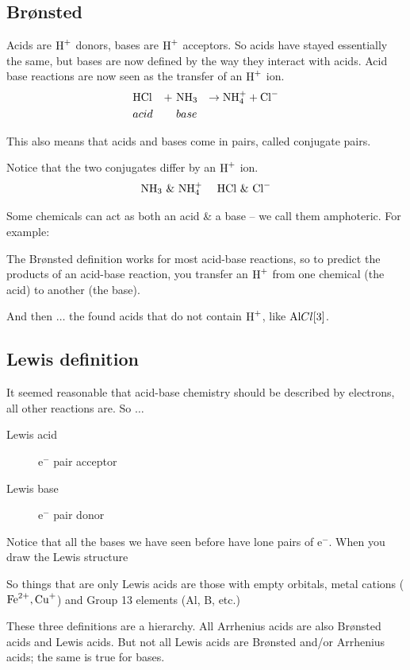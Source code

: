 \documentclass[
	chapter=4
]{chem122notes}
\begin{document}
\subsection{Br\o{}nsted}\label{subsec:bronsted}
Acids are $\element{H}^{+}$ donors, bases are $\element{H}^{+}$ acceptors.
So acids have stayed essentially the same, but bases are now defined by the way they interact with acids.
Acid base reactions are now seen as the transfer of an $\element{H}^{+}$ ion.
\begin{equation*}
\begin{aligned}
	&\element{H}\element{Cl}& +\ &\element{N}\element{H}[3]& \rightarrow \element{N}\element{H}[4]^{+} + \element{Cl}^{-}\\
	&acid& &base&
\end{aligned}
\end{equation*}

This also means that acids and bases come in pairs, called conjugate pairs.

Notice that the two conjugates differ by an $\element{H}^{+}$ ion.
\[ \element{N}\element{H}[3]\ \&\ \element{N}\element{H}[4]^{+}\ \ \ \ \element{H}\element{Cl}\ \&\ \element{Cl}^{-} \]

Some chemicals can act as both an acid \& a base -- we call them amphoteric.
For example:

The Br\o{}nsted definition works for most acid-base reactions, so to predict the products of an acid-base reaction, you transfer an $\element{H}^{+}$ from one chemical (the acid) to another (the base).

And then $\dots$ the found acids that do not contain $\element{H}^{+}$, like $\element{Al}{Cl}[3]$.

\subsection{Lewis definition}\label{subsec:lewis-definition}
It seemed reasonable that acid-base chemistry should be described by electrons, all other reactions are.
So $\dots$
\begin{description}
	\item[Lewis acid] $\mbox{e}^{-}$ pair acceptor
	\item[Lewis base] $\mbox{e}^{-}$ pair donor
\end{description}
Notice that all the bases we have seen before have lone pairs of $\mbox{e}^{-}$.
When you draw the Lewis structure

So things that are only Lewis acids are those with empty orbitals, metal cations ($\element{Fe}^{2+}, \element{Cu}^{+}$) and Group 13 elements (Al, B, etc.)

These three definitions are a hierarchy.
All Arrhenius acids are also Br\o{}nsted acids and Lewis acids.
But not all Lewis acids are Br\o{}nsted and/or Arrhenius acids;
the same is true for bases.
\end{document}
